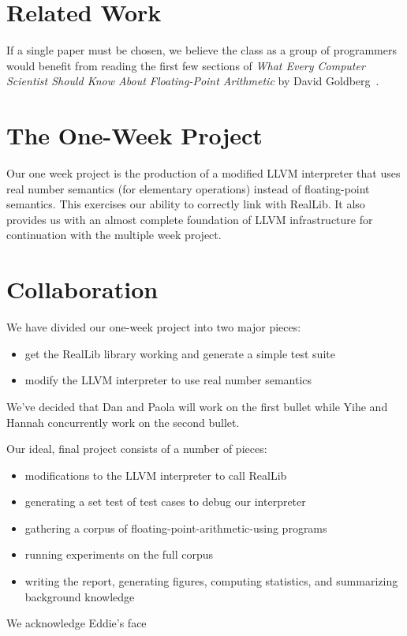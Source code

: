\documentclass[preprint, authoryear]{sigplanconf}
\begin{document}
\section{Related Work}

If a single paper must be chosen, we believe the class as a group of programmers
would benefit from reading the first few sections of \emph{What Every Computer
  Scientist Should Know About Floating-Point Arithmetic} by David
Goldberg~\cite{goldberg91}.

\section{The One-Week Project}

Our one week project is the production of a modified LLVM interpreter that uses
real number semantics (for elementary operations) instead of floating-point
semantics. This exercises our ability to correctly link with RealLib. It also
provides us with an almost complete foundation of LLVM infrastructure for
continuation with the multiple week project.

\section{Collaboration}

We have divided our one-week project into two major pieces:

\begin{itemize}
\item get the RealLib library working and generate a simple test suite
\item modify the LLVM interpreter to use real number semantics
\end{itemize}

We've decided that Dan and Paola will work on the first bullet while Yihe and
Hannah concurrently work on the second bullet.

Our ideal, final project consists of a number of pieces:

\begin{itemize}
\item modifications to the LLVM interpreter to call RealLib
\item generating a set test of test cases to debug our interpreter
\item gathering a corpus of floating-point-arithmetic-using programs
\item running experiments on the full corpus
\item writing the report, generating figures, computing statistics, and
  summarizing background knowledge
\end{itemize}

\acks

We acknowledge Eddie's face






\end{document}
